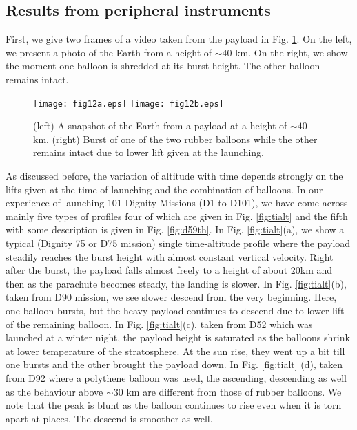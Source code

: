 \subsection{Results from peripheral instruments}

\label{sec:res}
First, we give two frames of a video taken from the payload in Fig. \ref{fig:campic}. 
On the left, we present a photo of the Earth from a height of $\sim 40$ km. 
On the right, we show the moment one balloon is shredded at its burst 
height. The other balloon remains intact. 

\begin{figure}[h]
  \centering
  \texttt{[image: fig12a.eps]}
\vspace{0.1cm}
  \texttt{[image: fig12b.eps]}
  \caption{(left) A snapshot of the Earth from a payload at a height of $\sim 40$ km.
(right) Burst of one of the two rubber balloons while the other remains intact due to
lower lift given at the launching.}
   \label{fig:campic}
\end{figure}

As discussed before, the variation of altitude with time depends strongly on 
the lifts given at the time of launching and the combination of balloons. In our
experience of launching 101 Dignity Missions (D1 to D101), we have come 
across mainly five types of profiles four of which are given in 
Fig. \ref{fig:tialt} and the fifth with some description 
is given in Fig. \ref{fig:d59th}. In Fig. \ref{fig:tialt}(a), we show a typical (Dignity 75 or D75 mission) 
single time-altitude profile where the payload steadily reaches the burst height with almost constant 
vertical velocity. Right after the burst, the payload falls almost freely to a height of about $20$km 
and then as the parachute becomes steady, the landing is slower. In Fig. \ref{fig:tialt}(b),  taken 
from D90 mission, we see slower descend from the very beginning. Here, one balloon bursts, but the heavy 
payload continues to descend due to lower lift of the remaining balloon. In Fig. \ref{fig:tialt}(c), 
taken from D52 which was launched at a winter night, the payload height is saturated as the balloons 
shrink at lower temperature of the stratosphere. At the sun rise, they went up a bit till one bursts 
and the other brought the payload down. In Fig. \ref{fig:tialt} (d), taken from D92 where a polythene 
balloon was used, the ascending, descending as well as the behaviour above $\sim 30$ km are different 
from those of rubber balloons. We note that the peak is blunt as the balloon continues to rise even 
when it is torn apart at places. The descend is smoother as well.

